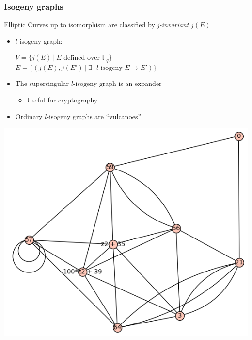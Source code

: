 \documentclass{beamer}
\newcommand{\F}{\mathbb{F}}
\begin{document}
\begin{frame}
    \frametitle{Isogeny graphs}
    Elliptic Curves up to isomorphism are classified by \emph{j-invariant} $j(E)$
    \begin{itemize}
        \item $l$-isogeny graph: \begin{minipage}[t]{0.6\textwidth}
            $V = \{ j(E) \ | \ \text{$E$ defined over $\F_q$} \}$\\
            $E = \{ (j(E), j(E') \ | \ \text{$\exists$ $l$-isogeny $E \to E'$}) \}$
        \end{minipage}
        \item The supersingular $l$-isogeny graph is an expander
        \begin{itemize}
            \item Useful for cryptography
        \end{itemize}
        \item Ordinary $l$-isogeny graphs are ``vulcanoes''
    \end{itemize}
    \begin{minipage}{0.49\textwidth}
        \includegraphics[width = \textwidth]{./example_supersingular.png}
    \end{minipage}
    \begin{minipage}{0.49\textwidth}

\end{minipage}
\end{frame}
\end{document}
